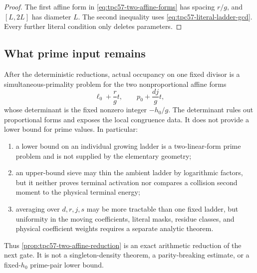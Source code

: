\begin{proof}
The first affine form in \eqref{eq:tpc57-two-affine-forms} has spacing
\(r/g\), and \([L,2L]\) has diameter \(L\).  The second inequality uses
\eqref{eq:tpc57-literal-ladder-gcd}.  Every further literal condition
only deletes parameters.
\end{proof}

\subsection{What prime input remains}

After the deterministic reductions, actual occupancy on one fixed
divisor is a simultaneous-primality problem for the two nonproportional
affine forms
\begin{equation}
 \ell_0+\frac r g t,
 \qquad
 p_0+\frac{dj}{g}t,
 \label{eq:tpc57-two-prime-problem}
\end{equation}
whose determinant is the fixed nonzero integer
\(-h_0/g\).  The determinant rules out proportional forms and exposes the
local congruence data.  It does not provide a lower bound for prime
values.  In particular:
\begin{enumerate}[label=\textup{(\roman*)},leftmargin=3em]
 \item a lower bound on an individual growing ladder is a two-linear-form
       prime problem and is not supplied by the elementary geometry;
 \item an upper-bound sieve may thin the ambient ladder by logarithmic
       factors, but it neither proves terminal activation nor compares a
       collision second moment to the physical terminal energy;
 \item averaging over \(d,r,j,s\) may be more tractable than one fixed
       ladder, but uniformity in the moving coefficients, literal masks,
       residue classes, and physical coefficient weights requires a
       separate analytic theorem.
\end{enumerate}
Thus \cref{prop:tpc57-two-affine-reduction} is an exact arithmetic
reduction of the next gate.  It is not a singleton-density theorem, a
parity-breaking estimate, or a fixed-\(h_0\) prime-pair lower bound.
